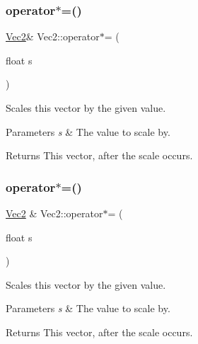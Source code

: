 \subsubsection{\texorpdfstring{operator$\ast$=()}{operator*=()}\hspace{0.1cm}{\footnotesize\ttfamily [1/2]}}
{\footnotesize\ttfamily \hyperlink{classVec2}{Vec2}\& Vec2\+::operator$\ast$= (\begin{DoxyParamCaption}\item[{float}]{s }\end{DoxyParamCaption})\hspace{0.3cm}{\ttfamily [inline]}}

Scales this vector by the given value.


\begin{DoxyParams}{Parameters}
{\em s} & The value to scale by. \\
\hline
\end{DoxyParams}
\begin{DoxyReturn}{Returns}
This vector, after the scale occurs. 
\end{DoxyReturn}
\mbox{\label{classVec2_a9ab811215385bea7bb254b12cc9665af}} 
\subsubsection{\texorpdfstring{operator$\ast$=()}{operator*=()}\hspace{0.1cm}{\footnotesize\ttfamily [2/2]}}
{\footnotesize\ttfamily \hyperlink{classVec2}{Vec2} \& Vec2\+::operator$\ast$= (\begin{DoxyParamCaption}\item[{float}]{s }\end{DoxyParamCaption})\hspace{0.3cm}{\ttfamily [inline]}}

Scales this vector by the given value.


\begin{DoxyParams}{Parameters}
{\em s} & The value to scale by. \\
\hline
\end{DoxyParams}
\begin{DoxyReturn}{Returns}
This vector, after the scale occurs. 
\end{DoxyReturn}
\mbox{\label{classVec2_ad2383d77974a8092b149391c2edce7fd}} 
